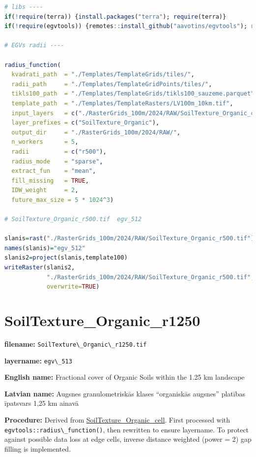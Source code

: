 \documentclass[
]{book}
\newcommand{\passthrough}[1]{#1}
\begin{document}
\begin{lstlisting}[language=R]
# libs ----
if(!require(terra)) {install.packages("terra"); require(terra)}
if(!require(egvtools)) {remotes::install_github("aavotins/egvtools"); require(egvtools)}

# EGVs radii ----

radius_function(
  kvadrati_path  = "./Templates/TemplateGrids/tiles/",
  radii_path     = "./Templates/TemplateGridPoints/tiles/",
  tikls100_path  = "./Templates/TemplateGrids/tikls100_sauzeme.parquet",
  template_path  = "./Templates/TemplateRasters/LV100m_10km.tif",
  input_layers   = c("./RasterGrids_100m/2024/RAW/SoilTexture_Organic_cell.tif"),
  layer_prefixes = c("SoilTexture_Organic"),
  output_dir     = "./RasterGrids_100m/2024/RAW/",
  n_workers      = 5,
  radii          = c("r500"),
  radius_mode    = "sparse",
  extract_fun    = "mean",
  fill_missing   = TRUE,
  IDW_weight     = 2,
  future_max_size = 5 * 1024^3)

# SoilTexture_Organic_r500.tif  egv_512

slanis=rast("./RasterGrids_100m/2024/RAW/SoilTexture_Organic_r500.tif")
names(slanis)="egv_512"
slanis2=project(slanis,template100)
writeRaster(slanis2,
            "./RasterGrids_100m/2024/RAW/SoilTexture_Organic_r500.tif",
            overwrite=TRUE)
\end{lstlisting}

\section{SoilTexture\_Organic\_r1250}\label{ch06.513}

\textbf{filename:} \passthrough{\lstinline!SoilTexture\_Organic\_r1250.tif!}

\textbf{layername:} \passthrough{\lstinline!egv\_513!}

\textbf{English name:} Fractional cover of Organic Soils within the 1.25 km landscape

\textbf{Latvian name:} Augsnes granulometriskās klases ``organiskās augsnes'' platības īpatsvars 1,25 km ainavā

\textbf{Procedure:} Derived from \hyperref[ch06.511]{SoilTexture\_Organic\_cell}. First processed
with \passthrough{\lstinline!egvtools::radius\_function()!}, then rewritten to ensure layername. To protect against
possible data loss at edge cells, inverse distance weighted (power = 2) gap filling
is implemented.
\end{document}
